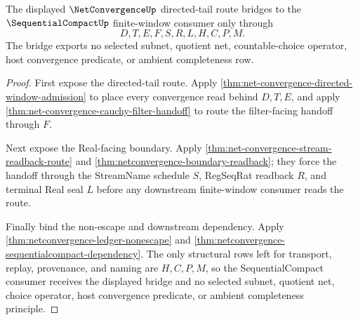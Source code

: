 \begin{theorem}
\label{thm:netconvergence-sequentialcompact-bridge}
The displayed $\NetConvergenceUp$ directed-tail route bridges to the $\SequentialCompactUp$ finite-window consumer only through
$$
D,T,E,F,S,R,L,H,C,P,M .
$$
The bridge exports no selected subnet, quotient net, countable-choice operator, host convergence predicate, or ambient completeness row.
\end{theorem}
\begin{proof}
First expose the directed-tail route. Apply \autoref{thm:net-convergence-directed-window-admission} to place every convergence read behind $D,T,E$, and apply \autoref{thm:net-convergence-cauchy-filter-handoff} to route the filter-facing handoff through $F$.

Next expose the Real-facing boundary. Apply \autoref{thm:net-convergence-stream-readback-route} and \autoref{thm:netconvergence-boundary-readback}; they force the handoff through the StreamName schedule $S$, RegSeqRat readback $R$, and terminal Real seal $L$ before any downstream finite-window consumer reads the route.

Finally bind the non-escape and downstream dependency. Apply \autoref{thm:netconvergence-ledger-nonescape} and \autoref{thm:netconvergence-sequentialcompact-dependency}. The only structural rows left for transport, replay, provenance, and naming are $H,C,P,M$, so the SequentialCompact consumer receives the displayed bridge and no selected subnet, quotient net, choice operator, host convergence predicate, or ambient completeness principle.
\end{proof}

